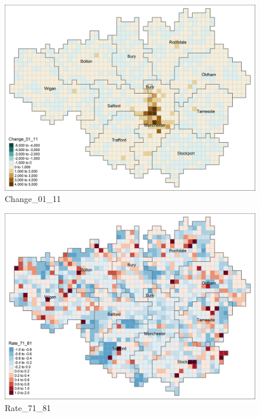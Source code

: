 \documentclass[
]{article}
\begin{document}
\begin{figure}
\centering
\includegraphics{Change_01_11.png}
\caption{Change\_01\_11}
\end{figure}

\begin{figure}
\centering
\includegraphics{Rate_71_81.png}
\caption{Rate\_71\_81}
\end{figure}
\end{document}
